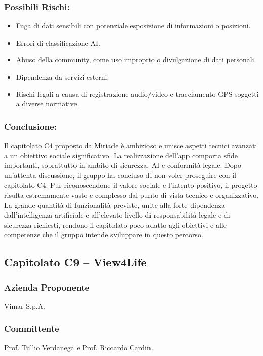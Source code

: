 \documentclass[a4paper,12pt]{article}
\begin{document}
\subsubsection*{Possibili Rischi:}
\begin{itemize}[leftmargin=*]
    \item Fuga di dati sensibili con potenziale esposizione di informazioni o posizioni.
    \item Errori di classificazione AI.
    \item Abuso della community, come uso improprio o divulgazione di dati personali.
    \item Dipendenza da servizi esterni.
    \item Rischi legali a causa di registrazione audio/video e tracciamento GPS soggetti a diverse normative.
\end{itemize}

\subsubsection*{Conclusione:}
Il capitolato C4 proposto da Miriade è ambizioso e unisce aspetti tecnici avanzati a un obiettivo sociale significativo.  
La realizzazione dell’app comporta sfide importanti, soprattutto in ambito di sicurezza, AI e conformità legale.
Dopo un’attenta discussione, il gruppo ha concluso di non voler proseguire con il capitolato C4.  
Pur riconoscendone il valore sociale e l’intento positivo, il progetto risulta estremamente vasto e complesso dal punto di vista tecnico e organizzativo.  
La grande quantità di funzionalità previste, unite alla forte dipendenza dall'intelligenza artificiale e all’elevato livello di responsabilità legale e di sicurezza richiesti, rendono il capitolato poco adatto agli obiettivi e alle competenze che il gruppo intende sviluppare in questo percorso.

\subsection{Capitolato C9 – View4Life}

\subsubsection*{Azienda Proponente}
Vimar S.p.A.

\subsubsection*{Committente}
Prof. Tullio Verdanega e Prof. Riccardo Cardin.
\end{document}

